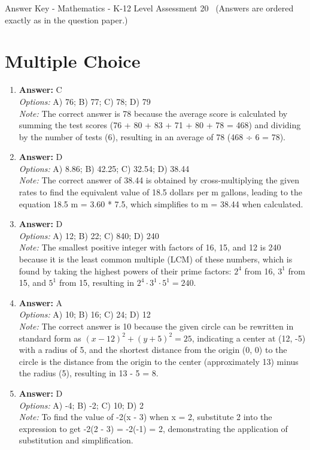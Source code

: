 \documentclass[12pt]{article}
\begin{document}
\begin{center}
Answer Key - Mathematics - K-12 Level Assessment 20 \
\small (Answers are ordered exactly as in the question paper.)
\end{center}

\section*{Multiple Choice}
\begin{enumerate}[label=\arabic*.]
\item \textbf{Answer:} C
\\ \textit{Options:} A) 76; B) 77; C) 78; D) 79
\\ \textit{Note:} The correct answer is 78 because the average score is calculated by summing the test scores (76 + 80 + 83 + 71 + 80 + 78 = 468) and dividing by the number of tests (6), resulting in an average of 78 (468 ÷ 6 = 78).
\item \textbf{Answer:} D
\\ \textit{Options:} A) 8.86; B) 42.25; C) 32.54; D) 38.44
\\ \textit{Note:} The correct answer of 38.44 is obtained by cross-multiplying the given rates to find the equivalent value of 18.5 dollars per m gallons, leading to the equation 18.5 m = 3.60 * 7.5, which simplifies to m = 38.44 when calculated.
\item \textbf{Answer:} D
\\ \textit{Options:} A) 12; B) 22; C) 840; D) 240
\\ \textit{Note:} The smallest positive integer with factors of 16, 15, and 12 is 240 because it is the least common multiple (LCM) of these numbers, which is found by taking the highest powers of their prime factors: \(2^4\) from 16, \(3^1\) from 15, and \(5^1\) from 15, resulting in \(2^4 \cdot 3^1 \cdot 5^1 = 240\).
\item \textbf{Answer:} A
\\ \textit{Options:} A) 10; B) 16; C) 24; D) 12
\\ \textit{Note:} The correct answer is 10 because the given circle can be rewritten in standard form as \((x - 12)^2 + (y + 5)^2 = 25\), indicating a center at (12, -5) with a radius of 5, and the shortest distance from the origin (0, 0) to the circle is the distance from the origin to the center (approximately 13) minus the radius (5), resulting in 13 - 5 = 8.
\item \textbf{Answer:} D
\\ \textit{Options:} A) -4; B) -2; C) 10; D) 2
\\ \textit{Note:} To find the value of -2(x - 3) when x = 2, substitute 2 into the expression to get -2(2 - 3) = -2(-1) = 2, demonstrating the application of substitution and simplification.
\end{enumerate}
\end{document}
